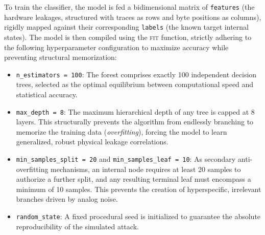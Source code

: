 \documentclass[11pt,a4paper]{report}
\begin{document}
To train the classifier, the model is fed a bidimensional matrix of \texttt{features} (the hardware leakages, structured with traces as rows and byte positions as columns), 
rigidly mapped against their corresponding \texttt{labels} (the known target internal states). 
The model is then compiled using the \textsc{fit} function, strictly adhering to the following hyperparameter configuration to maximize accuracy while preventing structural memorization:
\begin{itemize}
    \item \texttt{n\_estimators = 100}: The forest comprises exactly 100 independent decision trees, selected as the optimal equilibrium between computational speed and statistical accuracy.
    
    \item \texttt{max\_depth = 8}: The maximum hierarchical depth of any tree is capped at 8 layers. This structurally prevents the algorithm from endlessly branching to memorize the training data (\textit{overfitting}), forcing the model to learn generalized, robust physical leakage correlations.
    
    \item \texttt{min\_samples\_split = 20} and \texttt{min\_samples\_leaf = 10}: As secondary anti-overfitting mechanisms, an internal node requires at least 20 samples to authorize a further split, and any resulting terminal leaf must encompass a minimum of 10 samples. 
    This prevents the creation of hyperspecific, irrelevant branches driven by analog noise.

    \item \texttt{random\_state}: A fixed procedural seed is initialized to guarantee the absolute reproducibility of the simulated attack.
\end{itemize}
\end{document}
